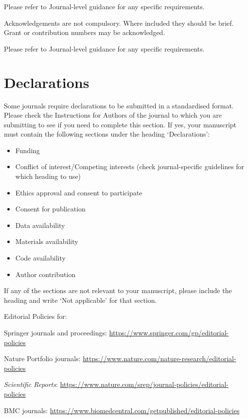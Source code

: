 \documentclass[pdflatex,sn-mathphys-num]{sn-jnl}%
\theoremstyle{thmstyleone}%
\theoremstyle{thmstyletwo}%
\theoremstyle{thmstylethree}%
\begin{document}
Please refer to Journal-level guidance for any specific requirements.


Acknowledgements are not compulsory. Where included they should be brief. Grant or contribution numbers may be acknowledged.

Please refer to Journal-level guidance for any specific requirements.

\section*{Declarations}

Some journals require declarations to be submitted in a standardised format. Please check the Instructions for Authors of the journal to which you are submitting to see if you need to complete this section. If yes, your manuscript must contain the following sections under the heading `Declarations':

\begin{itemize}
\item Funding
\item Conflict of interest/Competing interests (check journal-specific guidelines for which heading to use)
\item Ethics approval and consent to participate
\item Consent for publication
\item Data availability 
\item Materials availability
\item Code availability 
\item Author contribution
\end{itemize}

\noindent
If any of the sections are not relevant to your manuscript, please include the heading and write `Not applicable' for that section. 

\bigskip
\begin{flushleft}%
Editorial Policies for:

\bigskip\noindent
Springer journals and proceedings: \url{https://www.springer.com/gp/editorial-policies}

\bigskip\noindent
Nature Portfolio journals: \url{https://www.nature.com/nature-research/editorial-policies}

\bigskip\noindent
\textit{Scientific Reports}: \url{https://www.nature.com/srep/journal-policies/editorial-policies}

\bigskip\noindent
BMC journals: \url{https://www.biomedcentral.com/getpublished/editorial-policies}
\end{flushleft}
\end{document}
